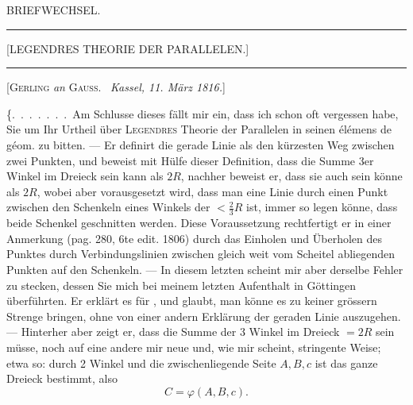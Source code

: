 \clearpage
{}\centerline{\Large BRIEFWECHSEL.}

\bigskip
\hrule
\bigskip

\centerline{[LEGENDRES THEORIE DER PARALLELEN.]}

\bigskip
\hrule
\bigskip

\centerline{[\textsc{Gerling} \emph{an} \textsc{Gauss}. \ \emph{Kassel, 11. März 1816.}]}

\smallskip

\{.\ .\ .\ .\ .\ .\ .\ Am Schlusse dieses fällt mir ein, dass ich schon oft vergessen habe, Sie um Ihr Urtheil über \textsc{Legendres} Theorie der Parallelen in seinen élémens de géom. zu bitten. --- Er definirt die gerade Linie als den kürzesten Weg zwischen zwei Punkten, und beweist mit Hülfe dieser Definition, dass die Summe 3er Winkel im Dreieck  sein kann als $2R$, nachher beweist er, dass sie auch  sein könne als $2R$, wobei aber vorausgesetzt wird, dass man eine Linie durch einen Punkt zwischen den Schenkeln eines Winkels der $< \tfrac{2}{3}R$ ist, immer so legen könne, dass beide Schenkel geschnitten werden. Diese Voraussetzung rechtfertigt er in einer Anmerkung (pag. 280, 6te edit. 1806) durch das Einholen und Überholen des Punktes durch Verbindungslinien zwischen gleich weit vom Scheitel abliegenden Punkten auf den Schenkeln. --- In diesem letzten scheint mir aber derselbe
Fehler zu stecken, dessen Sie mich bei meinem letzten Aufenthalt in Göttingen überführten. Er erklärt es für , und glaubt, man könne es zu keiner grössern Strenge bringen, ohne von einer andern Erklärung der geraden Linie auszugehen. --- Hinterher aber zeigt er, dass die Summe der 3 Winkel im Dreieck $= 2R$ sein müsse, noch auf eine andere mir neue und, wie mir scheint, stringente Weise; etwa so: durch 2 Winkel und die zwischenliegende Seite $A, B, c$ ist das ganze Dreieck bestimmt, also
\[
C = \varphi(A,B,c).
\]
